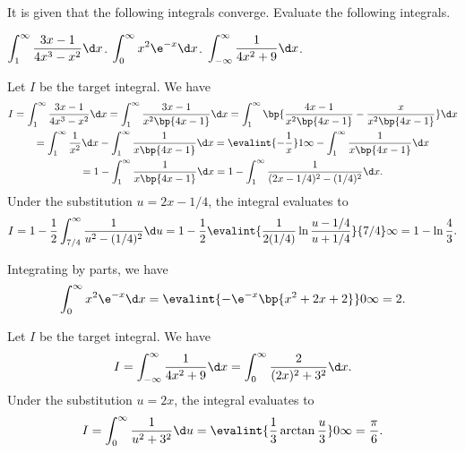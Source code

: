 \begin{problem}
    It is given that the following integrals converge. Evaluate the following integrals.
    \begin{tasks}
        \task $\displaystyle\int_1^\infty \frac{3x-1}{4x^3 - x^2} \d x$.
        \task $\displaystyle\int_0^\infty x^2 \e^{-x} \d x$.
        \task $\displaystyle\int_{-\infty}^{\infty} \frac1{4x^2 + 9} \d x$.
    \end{tasks}
\end{problem}
\begin{solution}
    \begin{ppart}
        Let $I$ be the target integral. We have
        \begin{gather*}
            I = \int_1^\infty \frac{3x-1}{4x^3 - x^2} \d x = \int_1^\infty \frac{3x-1}{x^2 \bp{4x - 1}} \d x = \int_1^\infty \bp{\frac{4x-1}{x^2 \bp{4x-1}} - \frac{x}{x^2 \bp{4x-1}}} \d x \\
            = \int_1^\infty \frac1{x^2} \d x - \int_1^\infty \frac1{x \bp{4x-1}} \d x = \evalint{-\frac1x}1\infty - \int_1^\infty \frac1{x \bp{4x-1}} \d x\\
            = 1 - \int_1^\infty \frac1{x \bp{4x-1}} \d x = 1 - \int_1^\infty \frac1{(2x - 1/4)^2 - (1/4)^2} \d x.
        \end{gather*}
        Under the substitution $u = 2x - 1/4$, the integral evaluates to \[I = 1 - \frac12 \int_{7/4}^\infty \frac1{u^2 - (1/4)^2} \d u = 1 - \frac12 \evalint{\frac1{2(1/4)} \ln{\frac{u - 1/4}{u + 1/4}}}{7/4}\infty = 1 - \ln \frac43.\]
    \end{ppart}
    \begin{ppart}
        Integrating by parts, we have \[\int_0^\infty x^2 \e^{-x} \d x = \evalint{-\e^{-x} \bp{x^2 + 2x + 2}}0\infty = 2.\]
    \end{ppart}
    \begin{ppart}
        Let $I$ be the target integral. We have \[I = \int_{-\infty}^{\infty} \frac1{4x^2 + 9} \d x = \int_0^\infty \frac2{(2x)^2 + 3^2} \d x.\] Under the substitution $u = 2x$, the integral evaluates to \[I = \int_0^\infty \frac1{u^2 + 3^2} \d u = \evalint{\frac13 \arctan \frac{u}{3}}0\infty = \frac{\pi}{6}.\]
    \end{ppart}
\end{solution}

